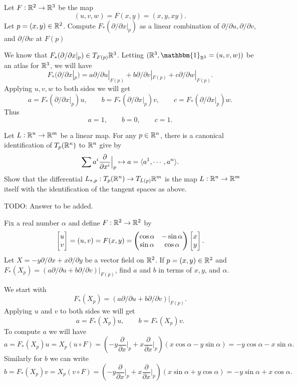 \begin{problem}
	Let $ F: \mathbb{R}^2 \to \mathbb{R}^3 $ be the map
	\[ (u,v,w) = F(x,y) = (x,y,xy). \]
	Let $ p = (x,y) \in \mathbb{R}^2 $. Compute $ F_*(\partial/\partial x|_p) $ as a linear combination of $ \partial/\partial u, \partial/\partial v $, and $ \partial/\partial w $ at $ F(p) $
\end{problem}
\begin{solution}
	We know that $ F_*(\partial/\partial x|_{p} ) \in T_{F(p)}\mathbb{R}^3 $. Letting $ (\R^3,\mathbbm{1}_{\R^3} = (u,v,w)) $ be an atlas for $ \mathbb{R}^3 $, we will have
	\[ F_*(\partial/\partial x|_{p} ) = a \partial/\partial u|_{F(p)} + b\partial/\partial v|_{F(p)} + c\partial/\partial w|_{F(p)}.    \]
	Applying $ u,v,w $ to both sides we will get
	\[ a = F_*(\partial/\partial x|_{p} ) u,\qquad b = F_*(\partial/\partial x|_{p} ) v, \qquad c = F_*(\partial/\partial x|_{p} ) w. \]
	Thus 
	\[ a = 1,\qquad b= 0, \qquad c = 1. \]
	
\end{solution}

\begin{problem}
	Let $ L:\mathbb{R}^n \to \mathbb{R}^m $ be a linear map. For any $ p \in \mathbb{R}^n $, there is a canonical identification of $ T_p(\mathbb{R}^n) $ to $ \mathbb{R}^n $ give by
	\[ \sum a^i \frac{\partial}{\partial  x^i}\big|_{p} \mapsto a = \langle a^1,\cdots,a^n \rangle. \]
	Show that the differential $ L_{*,p}:T_p(\mathbb{R}^n) \to T_{L(p)}\mathbb{R}^m $ is the map $ L:\mathbb{R}^n \to \mathbb{R}^m $ itself with the identification of the tangent spaces as above.
\end{problem}
\begin{solution}
	{\color{red} \noindent TODO: Answer to be added.}
\end{solution}

\begin{problem}
	Fix a real number $ \alpha $ and define $ F: \mathbb{R}^2 \to \mathbb{R}^2 $ by 
	\[ 
	\begin{bmatrix} u \\ v \end{bmatrix} = (u,v) = F(x,y) = \begin{pmatrix} \cos\alpha & -\sin\alpha \\ \sin\alpha & \cos\alpha \end{pmatrix}\begin{bmatrix} x \\ y \end{bmatrix}.
	 \]
	 Let $ X = -y\partial/\partial x + x\partial/\partial y $ be a vector field on $ \mathbb{R}^2 $. If $ p = (x,y) \in \mathbb{R}^2 $ and $ F_*(X_p) = (a\partial/\partial u + b\partial/\partial v)|_{F(p)}  $, find $ a $ and $ b $ in terms of $ x,y $, and $ \alpha $.
\end{problem}
\begin{solution}
	We start with 
	\[ F_*(X_p) = (a\partial/\partial u + b\partial/\partial v)|_{F(p)}.  \]
	Applying $ u $ and $ v $ to both sides we will get
	\[ a = F_*(X_p) u, \qquad b = F_*(X_p) v. \]
	To compute $ a $ we will have
	\[ a = F_*(X_p)u = X_p (u\circ F) = (-y\frac{\partial}{\partial  x}\big|_{p} + x \frac{\partial}{\partial  x}\big|_{p})(x\cos\alpha - y \sin\alpha) = -y\cos\alpha -x\sin\alpha. \]
	Similarly for $ b $ we can write
	\[ b = F_*(X_p)v = X_p (v\circ F) = (-y\frac{\partial}{\partial  x}\big|_{p} + x \frac{\partial}{\partial  x}\big|_{p})(x\sin\alpha + y \cos\alpha) = -y\sin\alpha +x\cos\alpha. \]
\end{solution}

